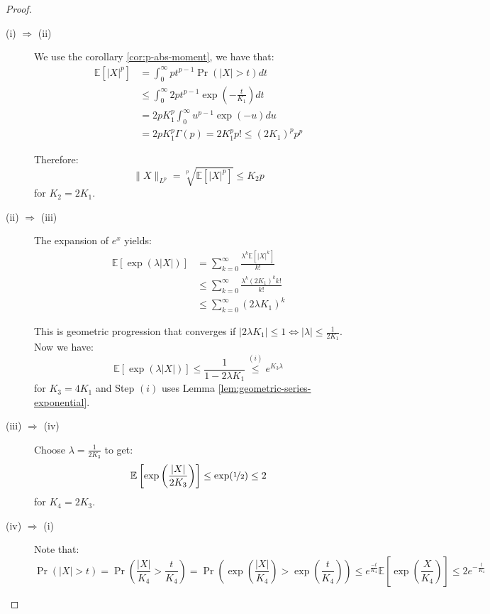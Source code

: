 \documentclass{article}
\theoremstyle{remark}
\newcommand{\Exp}{\mathbb{E}}
\begin{document}
\begin{proof}
\begin{description}
\item [(i) \(\Rightarrow\) (ii)] We use the corollary \ref{cor:p-abs-moment}, we have that:
\begin{align*}
\Exp[|X|^{p}] &= \int_{0}^{\infty} pt^{p-1}\Pr(|X| > t) dt \\
&\leq \int_{0}^{\infty} 2pt^{p-1}\exp\left(-\frac{t}{K_{1}}\right) dt \\
&= 2pK_{1}^{p}\int_{0}^{\infty} u^{p-1}\exp(-u) du \\
&= 2pK_{1}^{p} \Gamma(p) = 2K_{1}^{p} p! \leq (2K_{1})^{p} p^{p}
\end{align*}

Therefore:
\begin{equation*}
\|X\|_{L^{p}} = \sqrt[p]{\Exp[|X|^{p}]} \leq K_{2} p
\end{equation*}
for \(K_{2} = 2K_{1}\).

\item [(ii) \(\Rightarrow\) (iii)] The expansion of \(e^{x}\) yields:
\begin{align*}
\Exp[\exp(\lambda |X|)] &= \sum_{k=0}^{\infty} \frac{\lambda^{k} \Exp[|X|^{k}]}{k!} \\
&\leq \sum_{k=0}^{\infty} \frac{\lambda^{k} (2K_{1})^{k} k!}{k!} \\
&\leq \sum_{k=0}^{\infty} (2\lambda K_{1})^{k}
\end{align*}

This is geometric progression that converges if \(|2\lambda K_{1}| \leq 1 \Leftrightarrow |\lambda| \leq \frac{1}{2K_{1}}\). Now we have:
\begin{equation*}
\Exp[\exp(\lambda |X|)] \leq \frac{1}{1 - 2\lambda K_{1}} \overset{(i)}\leq e^{K_{3}\lambda}
\end{equation*}
for \(K_{3} = 4K_{1}\) and Step \((i)\) uses Lemma \ref{lem:geometric-series-exponential}.

\item [(iii) \(\Rightarrow\) (iv)] Choose \(\lambda = \frac{1}{2K_{3}}\) to get:
\begin{equation*}
\Exp\left[\exp\left(\frac{|X|}{2K_{3}}\right)\right] \leq \exp(\nicefrac{1}{2}) \leq 2
\end{equation*}
for \(K_{4} = 2K_{3}\).

\item [(iv) \(\Rightarrow\) (i)] Note that:
\begin{equation*}
\Pr(|X| > t) = \Pr\left(\frac{|X|}{K_{4}} > \frac{t}{K_{4}}\right) = \Pr\left(\exp\left(\frac{|X|}{K_{4}}\right) > \exp\left(\frac{t}{K_{4}}\right)\right) \leq e^{\frac{-t}{K_{4}}}\Exp\left[\exp\left(\frac{X}{K_{4}}\right)\right] \leq 2e^{-\frac{t}{K_{4}}}
\end{equation*}


\end{description}
\end{proof}
\end{document}
